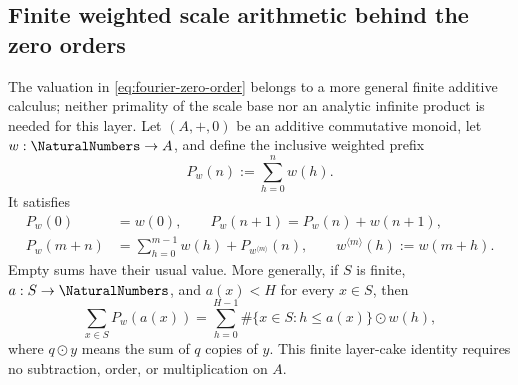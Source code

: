 \documentclass[11pt,oneside]{article}
\theoremstyle{definition}
\theoremstyle{remark}
\begin{document}
\subsection{Finite weighted scale arithmetic behind the zero orders}

The valuation in \eqref{eq:fourier-zero-order} belongs to a more general
finite additive calculus; neither primality of the scale base nor an analytic
infinite product is needed for this layer.  Let \((A,+,0)\) be an additive
commutative monoid, let \(w:\NaturalNumbers\to A\), and define the inclusive weighted
prefix
\begin{equation}
 P_w(n):=\sum_{h=0}^{n}w(h).                              \label{eq:weighted-inclusive-prefix}
\end{equation}
It satisfies
\begin{align}
 P_w(0)&=w(0),\qquad
 P_w(n+1)=P_w(n)+w(n+1),                                 \label{eq:weighted-prefix-boundaries}\\
 P_w(m+n)&=\sum_{h=0}^{m-1}w(h)+P_{w^{\langle m\rangle}}(n),
 \qquad w^{\langle m\rangle}(h):=w(m+h).                \label{eq:weighted-prefix-split}
\end{align}
Empty sums have their usual value.  More generally, if \(S\) is finite,
\(a:S\to\NaturalNumbers\), and \(a(x)<H\) for every \(x\in S\), then
\begin{equation}
 \sum_{x\in S}P_w(a(x))
 =\sum_{h=0}^{H-1}\#\{x\in S:h\le a(x)\}\odot w(h),     \label{eq:weighted-layer-cake}
\end{equation}
where \(q\odot y\) means the sum of \(q\) copies of \(y\).  This finite
layer-cake identity requires no subtraction, order, or multiplication on
\(A\).
\end{document}

